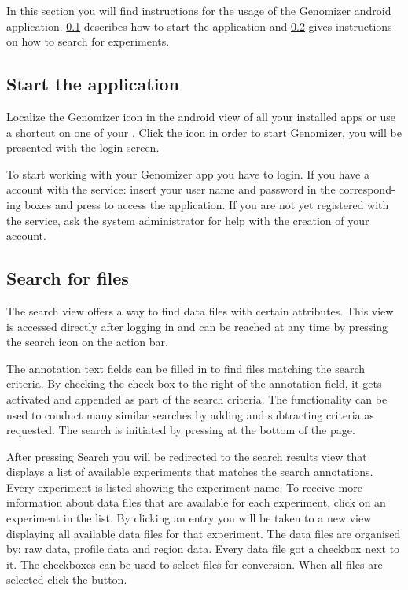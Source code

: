 In this section you will find instructions for the usage of the Genomizer android application. \ref{sec:and_start} describes how to start the application and \ref{sec:and_search} gives instructions on how to search for experiments.
\subsection{Start the application}\label{sec:and_start}
Localize the Genomizer icon in the android view of all your installed apps or
use a shortcut on one of your . Click the icon in order to start
Genomizer, you will be presented with the login screen.

To start working with your Genomizer app you have to login. If you have a
account with the service: insert your user name and password in the correspond-
ing boxes and press  to access the application. If you are not yet
registered with the service, ask the system administrator for help with
the creation of your account.
\subsection{Search for files}\label{sec:and_search}
The search view offers a way to find data files with certain attributes. This view is accessed directly after logging in and can be reached at any time by pressing the
search icon on the action bar.

The annotation text fields can be filled in to find files matching the search
criteria. By checking the check box to the right of the annotation field, it gets
activated and appended as part of the search criteria. The functionality can
be used to conduct many similar searches by adding and subtracting criteria as
requested. The search is initiated by pressing  at the bottom of the
page.

After pressing Search you will be  redirected to the search results view  that displays a list of available experiments that matches the search annotations. Every experiment is listed showing the experiment name. To receive more information about data files that are available for each experiment, click on an experiment in the list. By clicking an entry you will be taken to a new view displaying all available data files for that experiment. The data files are organised by: raw data, profile data and region data. Every data file got a checkbox next to it.  The checkboxes can be used to select files for conversion. When all files are selected click the  button.